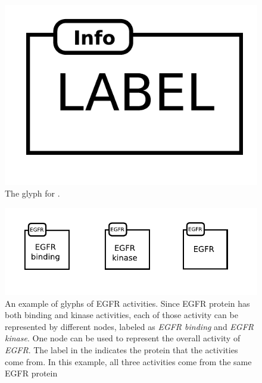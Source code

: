 \begin{figure}[H]
  \centering
  \includegraphics[scale=0.5]{images/biologicalActivity}
  \caption{The \AF glyph for .}
  \label{fig:af:biologicalActivity}
\end{figure}

\begin{figure}[H]
  \centering
  \includegraphics[scale = 1]{examples/EGFR}
  \caption{An example of \AF glyphs of EGFR activities.  Since EGFR protein has both binding and kinase activities, each of those activity can be represented by different nodes, labeled as \emph{EGFR binding} and \emph{EGFR kinase}.  One node can be used to represent the overall activity of \emph{EGFR}.  The label in the  indicates the protein that the activities come from.  In this example, all three activities come from the same EGFR protein}
  \label{fig:af:EGFR}
\end{figure} 